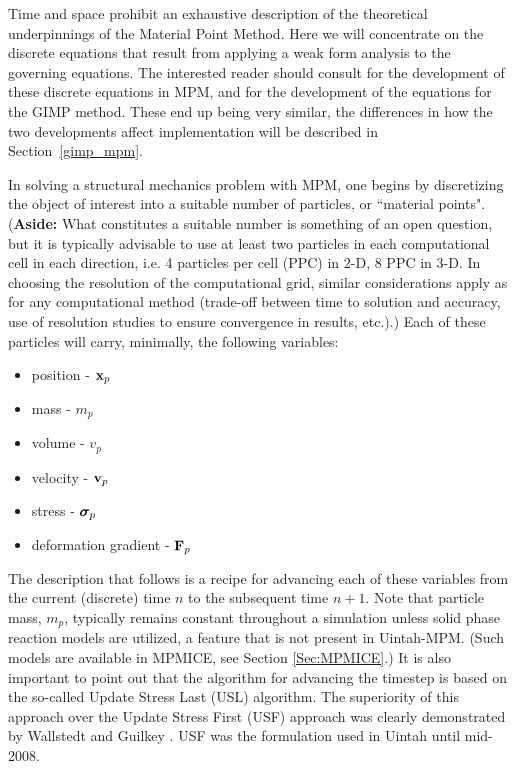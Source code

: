 Time and space prohibit an exhaustive description of the theoretical
underpinnings of the Material Point Method.   Here we will concentrate
on the discrete equations that result from applying a weak form analysis
to the governing equations.  The interested reader should
consult \cite{sulskycmame,sulskycpc} for the development of these discrete
equations in MPM, and \cite{bardgimp} for the development of the equations
for the GIMP method.  These end up being very similar, the differences in
how the two developments affect implementation will be described in
Section~\ref{gimp_mpm}.

In solving a structural mechanics problem with MPM, one begins by discretizing
the object of interest into a suitable number of particles, or ``material
points".  ({\bf Aside:}  What constitutes a suitable number is something of an open
question, but it is typically advisable to use at least two particles in each
computational cell in each direction, i.e. 4 particles per cell (PPC) in 2-D,
8 PPC in 3-D. In choosing the resolution of the computational grid, similar
considerations apply as for any computational method (trade-off between
time to solution and accuracy, use of resolution studies to ensure convergence
in results, etc.).)  Each of these particles will carry, minimally, the
following variables:
\begin{itemize}

\item position - $\bfx_p$
\item mass - $m_p$
\item volume - $v_p$
\item velocity - $\bfv_p$
\item stress - $\sig_p$ 
\item deformation gradient - $\bfF_p$

\end{itemize}

The description that follows is a recipe for advancing each of these
variables from the current (discrete) time $n$ to the subsequent
time $n+1$.  Note that particle mass, $m_p$, typically remains constant
throughout a simulation unless solid phase reaction models are utilized,
a feature that is not present in Uintah-MPM.  (Such models are available
in MPMICE, see Section \ref{Sec:MPMICE}.)  It is also important to point
out that the algorithm for advancing the timestep is based on the so-called
Update Stress Last (USL) algorithm.  The superiority of this approach over
the Update Stress First (USF) approach was clearly demonstrated by Wallstedt
and Guilkey \cite{WallstedtJCP}.  USF was the formulation used in Uintah
until mid-2008.

